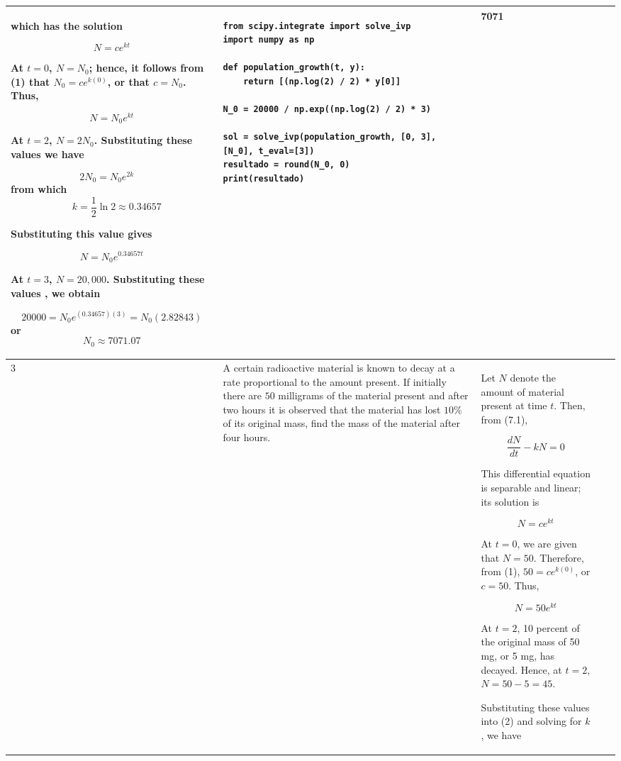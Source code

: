 \documentclass[a4paper,12pt]{article}
\begin{document}
\begin{longtable}{|p{0.3cm}|p{}|p{10cm}|p{}|p{1.5cm}|}
which has the solution

\[
N = ce^{kt}
\]

At \( t = 0 \), \( N = N_0 \); hence, it follows from (1) that \( N_0 = ce^{k(0)} \), or that \( c = N_0 \). Thus,

\[
N = N_0 e^{kt}
\]

At \( t = 2 \), \( N = 2N_0 \). Substituting these values  we have

\[
2N_0 = N_0 e^{2k} \quad\] from which  \[\quad k = \frac{1}{2} \ln 2 \approx 0.34657
\]

Substituting this value  gives

\[
N = N_0 e^{0.34657t}
\]

At \( t = 3 \), \( N = 20{,}000 \). Substituting these values , we obtain

$$20000 = N_0 e^{(0.34657)(3)} = N_0 (2.82843) $$ or $$ N_0 \approx 7071.07$$& 
\begin{verbatim}
from scipy.integrate import solve_ivp
import numpy as np

def population_growth(t, y):
    return [(np.log(2) / 2) * y[0]]

N_0 = 20000 / np.exp((np.log(2) / 2) * 3)

sol = solve_ivp(population_growth, [0, 3], [N_0], t_eval=[3])
resultado = round(N_0, 0)
print(resultado)
\end{verbatim}& 7071               \\ \hline
    3 & A certain radioactive material is known to decay at a rate proportional to the amount present. If initially there are $50$ milligrams of the material present and after two hours it is observed that the material has
lost $10\%$ of its original mass, find the mass of the material after four hours.   & 

Let \( N \) denote the amount of material present at time \( t \). Then, from (7.1),

\[
\frac{dN}{dt} - kN = 0
\]

This differential equation is separable and linear; its solution is

\[
N = ce^{kt}
\]

At \( t = 0 \), we are given that \( N = 50 \). Therefore, from (1), \( 50 = ce^{k(0)} \), or \( c = 50 \). Thus,

\[
N = 50 e^{kt}
\]

At \( t = 2 \), 10 percent of the original mass of 50 mg, or 5 mg, has decayed. Hence, at \( t = 2 \), \( N = 50 - 5 = 45 \).

Substituting these values into (2) and solving for \( k \), we have


\end{longtable}
\end{document}
